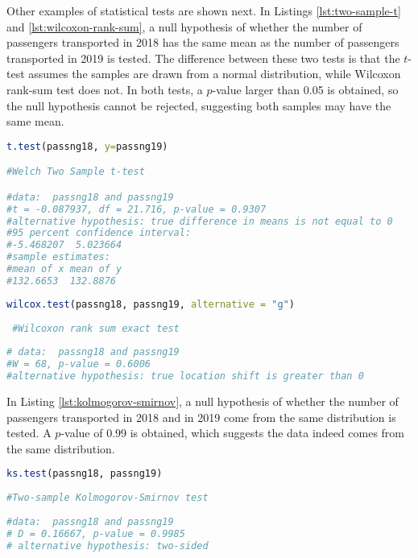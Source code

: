 \documentclass[letterpaper, 10 pt, conference]{article}
\begin{document}
 Other examples of statistical tests are shown next. In Listings \ref{lst:two-sample-t} and \ref{lst:wilcoxon-rank-sum}, a null hypothesis of whether the number of passengers transported in 2018 has the same mean as the number of passengers transported in 2019 is tested. The difference between these two tests is that the $t$-test assumes the samples are drawn from a normal distribution, while Wilcoxon rank-sum test does not. In both tests, a $p$-value larger than 0.05 is obtained, so the null hypothesis cannot be rejected, suggesting both samples may have the same mean.
  
  \begin{lstlisting}[language=R, caption={Two sample t-test.}, label={lst:two-sample-t} ]
t.test(passng18, y=passng19)

#Welch Two Sample t-test

#data:  passng18 and passng19
#t = -0.087937, df = 21.716, p-value = 0.9307
#alternative hypothesis: true difference in means is not equal to 0
#95 percent confidence interval:
#-5.468207  5.023664
#sample estimates:
#mean of x mean of y 
#132.6653  132.8876 
 \end{lstlisting}
 
 \begin{lstlisting}[language=R, caption={Wilcoxon rank sum test.}, label={lst:wilcoxon-rank-sum} ]
 wilcox.test(passng18, passng19, alternative = "g")
 
 #Wilcoxon rank sum exact test
 
# data:  passng18 and passng19
#W = 68, p-value = 0.6006
#alternative hypothesis: true location shift is greater than 0
 \end{lstlisting}
 
 In Listing \ref{lst:kolmogorov-smirnov}, a null hypothesis of whether the number of passengers transported in 2018 and in 2019 come from the same distribution is tested. A $p$-value of 0.99 is obtained, which suggests the data indeed comes from the same distribution. 
 \begin{lstlisting}[language=R, caption={Kolmogorov Smirnov test.}, label={lst:kolmogorov-smirnov} ]
 ks.test(passng18, passng19)
 
#Two-sample Kolmogorov-Smirnov test
 
#data:  passng18 and passng19
# D = 0.16667, p-value = 0.9985
# alternative hypothesis: two-sided
 \end{lstlisting}
 
\end{document}
